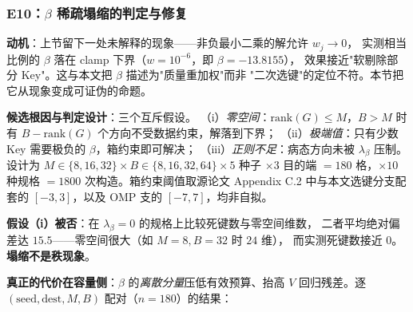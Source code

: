 \subsubsection{E10：$\beta$ 稀疏塌缩的判定与修复}
\label{sec:exp-e10}

\textbf{动机}：上节留下一处未解释的现象——非负最小二乘的解允许 $w_j\to0$，
实测相当比例的 $\beta$ 落在 clamp 下界（$w=10^{-6}$，即 $\beta=-13.8155$），
效果接近"软剔除部分 Key"。这与本文把 $\beta$ 描述为"质量重加权"而非
"二次选键"的定位不符。本节把它从现象变成可证伪的命题。

\textbf{候选根因与判定设计}：三个互斥假设。
（i）\emph{零空间}：$\mathrm{rank}(G)\le M$，$B>M$ 时有 $B-\mathrm{rank}(G)$
个方向不受数据约束，解落到下界；
（ii）\emph{极端值}：只有少数 Key 需要极负的 $\beta$，箱约束即可解决；
（iii）\emph{正则不足}：病态方向未被 $\lambda_\beta$ 压制。
设计为 $M\in\{8,16,32\}\times B\in\{8,16,32,64\}\times 5$ 种子 $\times 3$ 目的端
$=180$ 格，$\times 10$ 种规格 $=1800$ 次构造。箱约束阈值取源论文
Appendix C.2 中与本文选键分支配套的 $[-3,3]$，以及 OMP 支的 $[-7,7]$，均非自拟。

\textbf{假设（i）被否}：在 $\lambda_\beta=0$ 的规格上比较死键数与零空间维数，
二者平均绝对偏差达 $15.5$——零空间很大（如 $M=8,B=32$ 时 $24$ 维），
而实测死键数接近 $0$。\textbf{塌缩不是秩现象}。

\textbf{真正的代价在容量侧}：$\beta$ 的\emph{离散分量}压低有效预算、抬高
$V$ 回归残差。逐 $(\text{seed},\text{dest},M,B)$ 配对（$n=180$）的结果：

